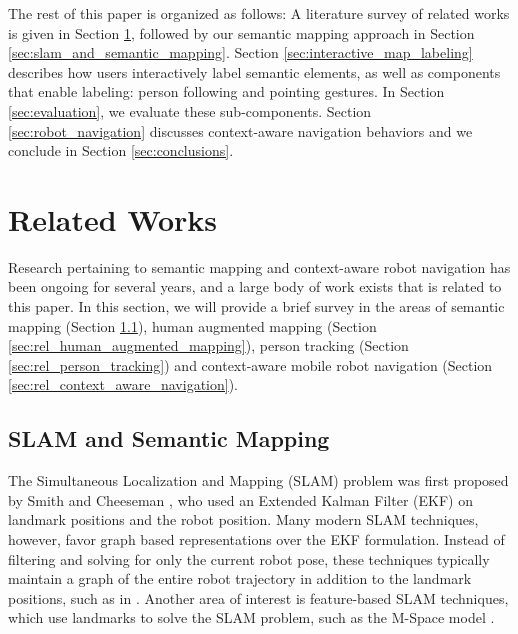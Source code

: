\documentclass{tADR2e}
\begin{document}
The rest of this paper is organized as follows: A literature survey of related works is given in Section \ref{sec:related_works}, followed by our semantic mapping approach in Section \ref{sec:slam_and_semantic_mapping}. Section \ref{sec:interactive_map_labeling} describes how users interactively label semantic elements, as well as components that enable labeling: person following and pointing gestures. In Section \ref{sec:evaluation}, we evaluate these sub-components. Section \ref{sec:robot_navigation} discusses context-aware navigation behaviors and we conclude in Section \ref{sec:conclusions}.

\section{Related Works}
\label{sec:related_works}

Research pertaining to semantic mapping and context-aware robot navigation has been ongoing for several years, and a large body of work exists that is related to this paper. In this section, we will provide a brief survey in the areas of semantic mapping (Section \ref{sec:rel_slam_and_semantic_mapping}), human augmented mapping (Section \ref{sec:rel_human_augmented_mapping}), person tracking (Section \ref{sec:rel_person_tracking}) and context-aware mobile robot navigation (Section \ref{sec:rel_context_aware_navigation}).

\subsection{SLAM and Semantic Mapping}
\label{sec:rel_slam_and_semantic_mapping}

The Simultaneous Localization and Mapping (SLAM) problem was first proposed by
Smith and Cheeseman \cite{smith1986representation}, who used an Extended Kalman Filter (EKF) on landmark
positions and the robot position. Many modern SLAM techniques, however, favor graph
based representations over the EKF formulation. Instead of filtering and solving for only the current robot pose,
these techniques typically maintain a graph of the entire robot trajectory in addition to the landmark positions, such as in \cite{dellaert2006square}. Another area of interest is feature-based SLAM techniques, which use
landmarks to solve the SLAM problem, such as the M-Space model \cite{folkesson2007m}.
\end{document}
